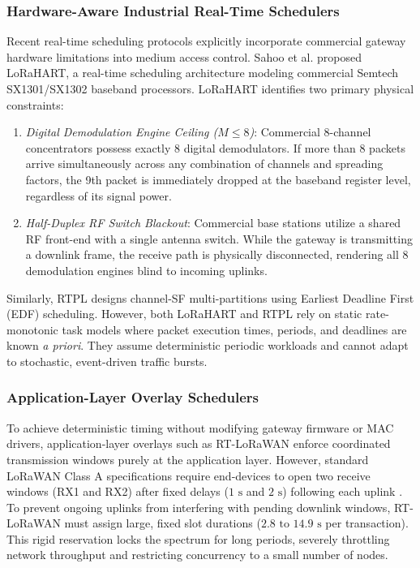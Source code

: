 \documentclass[preprint,review,12pt]{elsarticle}
\begin{document}
\subsubsection{Hardware-Aware Industrial Real-Time Schedulers}
Recent real-time scheduling protocols explicitly incorporate commercial gateway hardware limitations into medium access control. Sahoo et al. \cite{sahoo2025lorahart} proposed LoRaHART, a real-time scheduling architecture modeling commercial Semtech SX1301/SX1302 baseband processors. LoRaHART identifies two primary physical constraints:
\begin{enumerate}
    \item \textit{Digital Demodulation Engine Ceiling ($M \le 8$)}: Commercial 8-channel concentrators possess exactly 8 digital demodulators. If more than 8 packets arrive simultaneously across any combination of channels and spreading factors, the 9th packet is immediately dropped at the baseband register level, regardless of its signal power.
    \item \textit{Half-Duplex RF Switch Blackout}: Commercial base stations utilize a shared RF front-end with a single antenna switch. While the gateway is transmitting a downlink frame, the receive path is physically disconnected, rendering all 8 demodulation engines blind to incoming uplinks.
\end{enumerate}
Similarly, RTPL \cite{fahmida2024rtpl} designs channel-SF multi-partitions using Earliest Deadline First (EDF) scheduling. However, both LoRaHART and RTPL rely on static rate-monotonic task models where packet execution times, periods, and deadlines are known \textit{a priori}. They assume deterministic periodic workloads and cannot adapt to stochastic, event-driven traffic bursts.

\subsubsection{Application-Layer Overlay Schedulers}
To achieve deterministic timing without modifying gateway firmware or MAC drivers, application-layer overlays such as RT-LoRaWAN \cite{finochietto2023adding} enforce coordinated transmission windows purely at the application layer. However, standard LoRaWAN Class A specifications require end-devices to open two receive windows (RX1 and RX2) after fixed delays ($1\text{ s}$ and $2\text{ s}$) following each uplink \cite{semtech2020sx1276}. To prevent ongoing uplinks from interfering with pending downlink windows, RT-LoRaWAN must assign large, fixed slot durations ($2.8\text{ to }14.9\text{ s}$ per transaction). This rigid reservation locks the spectrum for long periods, severely throttling network throughput and restricting concurrency to a small number of nodes.
\end{document}
